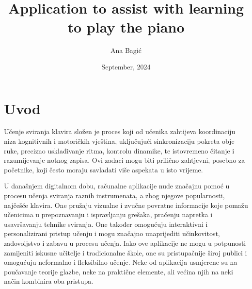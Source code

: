 \documentclass[diplomskirad, upload]{fer}
\begin{document}
\title{Application to assist with learning to play the piano}



\author{Ana Bagić}


\date{September, 2024}


\maketitle






\begin{zahvale}
\end{zahvale}


\mainmatter



\tableofcontents



\chapter{Uvod}
Učenje sviranja klavira složen je proces koji od učenika zahtijeva koordinaciju niza kognitivnih i motoričkih vještina, uključujući sinkronizaciju pokreta obje ruke, precizno usklađivanje ritma, kontrolu dinamike, te istovremeno čitanje i razumijevanje notnog zapisa. Ovi zadaci mogu biti prilično zahtjevni, posebno za početnike, koji često moraju savladati više aspekata u isto vrijeme.

U današnjem digitalnom dobu, računalne aplikacije nude značajnu pomoć u procesu učenja sviranja raznih instrumenata, a zbog njegove popularnosti, najčešće klavira. One pružaju vizualne i zvučne povratne informacije koje pomažu učenicima u prepoznavanju i ispravljanju grešaka, praćenju napretka i usavršavanju tehnike sviranja. One također omogućuju interaktivni i personalizirani pristup učenju i mogu značajno unaprijediti učinkovitost, zadovoljstvo i zabavu u procesu učenja. Iako ove aplikacije ne mogu u potpunosti zamijeniti iskusne učitelje i tradicionalne škole, one su pristupačnije široj publici i omogućuju neformalno i fleksibilno učenje. Neke od aplikacija usmjerene su na poučavanje teorije glazbe, neke na praktične elemente, ali većina njih na neki način kombinira oba pristupa.
\end{document}
